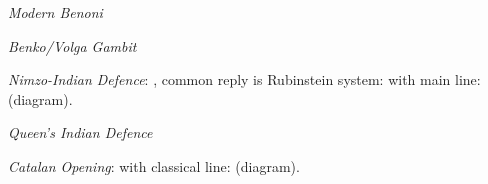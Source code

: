 \begin{minipage}[t]{.225\linewidth}
\raggedright
\begin{center}
\scalebox{.700}{\showboard}
\end{center}
\newgame
\emph{Modern Benoni}
\vspace{2mm}
\end{minipage}
\hspace{5mm}
\begin{minipage}[t]{.225\linewidth}
\raggedright
\begin{center}
\scalebox{.700}{\showboard}
\end{center}
\newgame
\emph{Benko/Volga Gambit}
\vspace{2mm}
\end{minipage}
\hspace{5mm}
\begin{minipage}[t]{.225\linewidth}
\raggedright
\begin{center}
\scalebox{.700}{\showboard}
\end{center}
\newgame
\emph{Nimzo-Indian Defence}: , common reply is Rubinstein system:  with main line:  (diagram).\vspace{2mm}
\end{minipage}
\hspace{5mm}
\begin{minipage}[t]{.225\linewidth}
\raggedright
\begin{center}
\scalebox{.700}{\showboard}
\end{center}
\newgame
\emph{Queen's Indian Defence}
\vspace{2mm}
\end{minipage}
\newline
\begin{minipage}[t]{.225\linewidth}
\raggedright
\begin{center}
\scalebox{.700}{\showboard}
\end{center}
\newgame
\emph{Catalan Opening}:  with classical line:  (diagram).\vspace{2mm}
\end{minipage}
